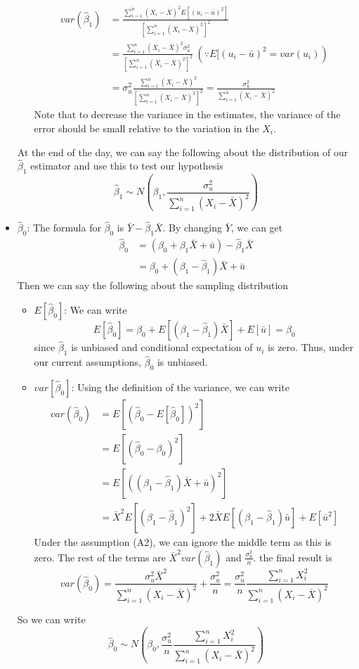 \documentclass[12pt]{article}
\theoremstyle{definition}
\theoremstyle{property}
\theoremstyle{assumption}
\theoremstyle{example}
\theoremstyle{comment}
\begin{document}
\begin{itemize}
\begin{itemize}
\[
\begin{aligned}
var(\hat{\beta}_1)&=\frac{\sum_{i=1}^n(X_i-\bar{X})^2E[(u_i-\bar{u})^2]}{[\sum_{i=1}^n(X_i-\bar{X})^2]^2}\\
&=\frac{\sum_{i=1}^n(X_i-\bar{X})^2\sigma_u^2}{[\sum_{i=1}^n(X_i-\bar{X})^2]^2} \ (\because E[(u_i-\bar{u})^2=var(u_i))\\
&=\sigma_u^2\frac{\sum_{i=1}^n(X_i-\bar{X})^2}{[\sum_{i=1}^n(X_i-\bar{X})^2]^2} =\frac{\sigma_u^2}{\sum_{i=1}^n(X_i-\bar{X})^2}
\end{aligned}
\]
Note that  to decrease the variance in the estimates, the variance of the error should be small relative to the variation in the $X_i$. 
\end{itemize}
At the end of the day, we can say the following about the distribution of our $\hat{\beta}_1$ estimator and use this to test our hypothesis
\[
\hat{\beta}_1 \sim N\left(\beta_1, \frac{\sigma_u^2}{\sum_{i=1}^n(X_i-\bar{X})^2}\right)
\]
\item $\hat{\beta}_0$: The formula for $\hat{\beta}_0$ is $\bar{Y}-\hat{\beta}_1\bar{X}$. By changing $\bar{Y}$, we can get
\[
\begin{aligned}
\hat{\beta}_0&=(\beta_0+\beta_1\bar{X}+\bar{u})-\hat{\beta}_1\bar{X}\\
&=\beta_0+(\beta_1-\hat{\beta}_1)\bar{X}+\bar{u}
\end{aligned}
\]
Then we can say the following about the sampling distribution
\begin{itemize}
\item $E[\hat{\beta}_0]$: We can write
\[
E[\hat{\beta}_0]=\beta_0+E[(\beta_1-\hat{\beta}_1)\bar{X}]+E[\bar{u}]=\beta_0
\]
since $\hat{\beta}_1$ is unbiased and conditional expectation of $u_i$ is zero. Thus, under our current assumptions, $\hat{\beta}_0$ is unbiased. 
\item $var[\hat{\beta}_0]$: Using the definition of the variance, we can write \[
\begin{aligned}
var(\hat{\beta}_0)&=E\left[\left(\hat{\beta}_0-E[\hat{\beta}_0]\right)^2\right] \\
&=E\left[\left(\hat{\beta}_0-{\beta}_0\right)^2\right]\\
&=E\left[\left( (\beta_1-\hat{\beta}_1)\bar{X}+\bar{u}\right)^2\right]\\
&=\bar{X}^2E\left[\left(\beta_1-\hat{\beta}_1 \right)^2\right]+ 2\bar{X}E\left[\left(\beta_1-\hat{\beta}_1 \right)\bar{u}\right] + E[\bar{u}^2]
\end{aligned}
\]
Under the assumption (A2), we can ignore the middle term as this is zero. The rest of the terms are $\bar{X}^2 var(\hat{\beta}_1)$ and $\frac{\sigma_u^2}{n}$. the final result is
\[
var(\hat{\beta}_0)=\frac{\sigma_u^2\bar{X}^2}{\sum_{i=1}^n(X_i-\bar{X})^2}+\frac{\sigma_u^2}{n}= \frac{\sigma_u^2}{n}\frac{\sum_{i=1}^nX_i^2}{\sum_{i=1}^n(X_i-\bar{X})^2}
\]
\end{itemize}
So we can write 
\[
\hat{\beta}_0 \sim N\left(\beta_0, \frac{\sigma_u^2}{n}\frac{\sum_{i=1}^nX_i^2}{\sum_{i=1}^n(X_i-\bar{X})^2}\right)
\]
\end{itemize}
\end{document}
